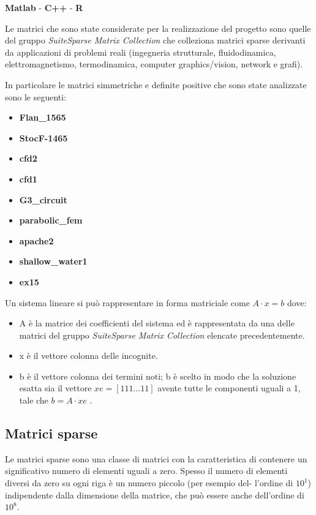 \documentclass[preprint,12pt]{elsarticle}
\begin{document}
\begin{center}
	\textbf{Matlab} \quad - \quad \textbf{C++} \quad - \quad \textbf{R}
\end{center}

Le matrici che sono state considerate per la realizzazione del progetto sono quelle del gruppo \textit{SuiteSparse Matrix Collection} che colleziona matrici sparse derivanti da applicazioni di problemi reali (ingegneria strutturale, fluidodinamica, elettromagnetismo, termodinamica, computer graphics/vision, network e grafi).

In particolare le matrici simmetriche e definite positive che sono state analizzate sono le seguenti:
\begin{multicols}{2}
	\begin{itemize}
		\item \textbf{Flan\_1565}
		\item \textbf{StocF-1465}
		\item \textbf{cfd2}
		\item \textbf{cfd1}
		\item \textbf{G3\_circuit}
		\item \textbf{parabolic\_fem}
		\item \textbf{apache2}
		\item \textbf{shallow\_water1}
		\item \textbf{ex15}
	\end{itemize}
\end{multicols}
Un sistema lineare si può rappresentare in forma matriciale come $ A \cdot x = b $
dove:
\begin{itemize}
	\item A è la matrice dei coefficienti del sistema ed è rappresentata da una delle matrici del gruppo \textit{SuiteSparse Matrix Collection} elencate precedentemente.
	\item x è il vettore colonna delle incognite.
	\item b è il vettore colonna dei termini noti; b è scelto in modo che la soluzione esatta sia il vettore $ xe = [1 1 1 \dots 1 1] $ avente tutte le componenti uguali a 1, tale che $ b = A \cdot xe $ .
\end{itemize}


\subsection*{Matrici sparse}
Le matrici sparse sono una classe di matrici con la caratteristica di contenere un significativo numero di elementi uguali a zero. Spesso il numero di elementi diversi da zero su ogni riga è un numero piccolo (per esempio del- l’ordine di $10^1$) indipendente dalla dimensione della matrice, che può essere anche dell’ordine di $10^8$.
\end{document}
